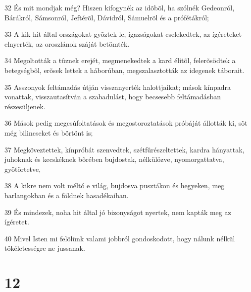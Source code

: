\par 32 És mit mondjak még? Hiszen kifogynék az idõbõl, ha szólnék Gedeonról, Bárákról, Sámsonról, Jeftérõl, Dávidról, Sámuelrõl és a prófétákról;
\par 33 A kik hit által országokat gyõztek le, igazságokat cselekedtek, az ígéreteket elnyerték, az oroszlánok száját betömték.
\par 34 Megoltották a tûznek erejét, megmenekedtek a kard élitõl, felerõsödtek a betegségbõl, erõsek lettek a háborúban, megszalasztották az idegenek  táborait.
\par 35 Asszonyok feltámadás útján visszanyerték halottjaikat; mások kínpadra vonattak, visszautasítván a szabadulást, hogy becsesebb feltámadásban részesüljenek.
\par 36 Mások pedig megcsúfoltatások és megostoroztatások próbáját állották ki, sõt még bilincseket és börtönt is;
\par 37 Megköveztettek, kínpróbát szenvedtek, szétfûrészeltettek, kardra hányattak, juhoknak és kecskéknek bõrében bujdostak, nélkülözve, nyomorgattatva, gyötörtetve,
\par 38 A kikre nem volt méltó e világ, bujdosva pusztákon és hegyeken, meg barlangokban és a földnek hasadékaiban.
\par 39 És mindezek, noha hit által jó bizonyságot nyertek, nem kapták meg az ígéretet.
\par 40 Mivel Isten mi felõlünk valami jobbról gondoskodott, hogy nálunk nélkül tökéletességre ne jussanak.

\chapter{12}

